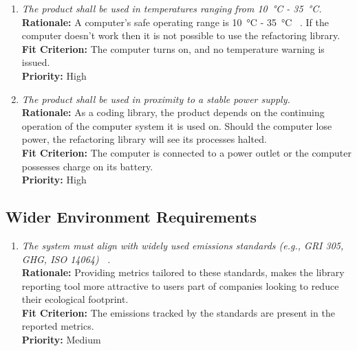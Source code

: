 \documentclass[12pt]{article}
\begin{document}
\begin{enumerate}[label=OER-EP \arabic*., wide=0pt, leftmargin=*]
  \item \emph{The product shall be used in temperatures ranging from
    \SI{10}{\celsius} - \SI{35}{\celsius}.}\\[2mm]
    {\bf Rationale:} A computer's safe operating range is
    \SI{10}{\celsius} - \SI{35}{\celsius} ~\citep{PCTemp}. If the
    computer doesn't work then it is not possible to use the
    refactoring library. \\
    {\bf Fit Criterion:} The computer turns on, and no temperature
    warning is issued. \\
    {\bf Priority:} High
  \item \emph{The product shall be used in proximity to a stable
    power supply.}\\
    {\bf Rationale:} As a coding library, the product depends on the
    continuing operation of the computer system it is used on. Should
    the computer lose power, the refactoring library will see its
    processes halted. \\
    {\bf Fit Criterion:} The computer is connected to a power outlet
    or the computer possesses charge on its battery. \\
    {\bf Priority:} High
\end{enumerate}

\subsection{Wider Environment Requirements}
\begin{enumerate}[label=OER-WE \arabic*., wide=0pt, leftmargin=*]
  \item \emph{The system must align with widely used emissions
      standards (e.g., GRI 305, GHG, ISO 14064)
    ~\citep{GHG,ISO14064,GRI305}.}\\[2mm]
    {\bf Rationale:} Providing metrics tailored to these standards,
    makes the library reporting tool more attractive to users part of
    companies looking to reduce their ecological footprint. \\
    {\bf Fit Criterion:} The emissions tracked by the standards are
    present in the reported metrics. \\
    {\bf Priority:} Medium
\end{enumerate}
\end{document}

